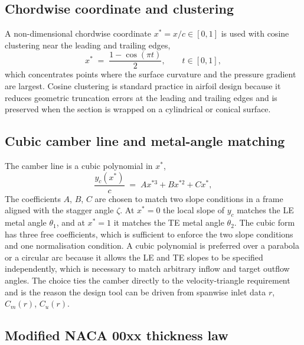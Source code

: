 \subsection{Chordwise coordinate and clustering}
\label{sec:theory_clustering}
 
A non-dimensional chordwise coordinate $x^* = x/c \in [0, 1]$ is used with cosine clustering near the leading and trailing edges,
\begin{equation}
x^* \;=\; \frac{1 - \cos(\pi t)}{2}, \qquad t \in [0, 1],
\label{eq:cosine_clustering}
\end{equation}
which concentrates points where the surface curvature and the pressure gradient are largest. Cosine clustering is standard practice in airfoil design because it reduces geometric truncation errors at the leading and trailing edges and is preserved when the section is wrapped on a cylindrical or conical surface.
 
\subsection{Cubic camber line and metal-angle matching}
\label{sec:theory_camber}
 
The camber line is a cubic polynomial in $x^*$,
\begin{equation}
\frac{y_c(x^*)}{c} \;=\; A x^{*3} + B x^{*2} + C x^*,
\label{eq:camber_cubic}
\end{equation}
The coefficients $A$, $B$, $C$ are chosen to match two slope conditions in a frame aligned with the stagger angle $\zeta$. At $x^* = 0$ the local slope of $y_c$ matches the LE metal angle $\theta_1$, and at $x^* = 1$ it matches the TE metal angle $\theta_2$. The cubic form has three free coefficients, which is sufficient to enforce the two slope conditions and one normalisation condition. A cubic polynomial is preferred over a parabola or a circular arc because it allows the LE and TE slopes to be specified independently, which is necessary to match arbitrary inflow and target outflow angles. The choice ties the camber directly to the velocity-triangle requirement and is the reason the design tool can be driven from spanwise inlet data $r$, $C_m(r)$, $C_u(r)$.
 
\subsection{Modified NACA 00xx thickness law}
\label{sec:theory_thickness}
 

